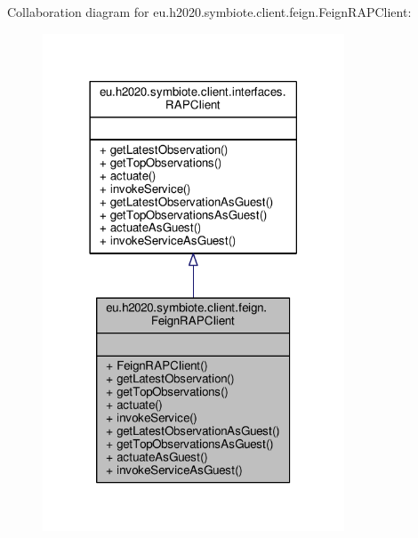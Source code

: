 Collaboration diagram for eu.\+h2020.\+symbiote.\+client.\+feign.\+Feign\+R\+A\+P\+Client\+:\nopagebreak
\begin{figure}[H]
\begin{center}
\leavevmode
\includegraphics[width=254pt]{classeu_1_1h2020_1_1symbiote_1_1client_1_1feign_1_1FeignRAPClient__coll__graph}
\end{center}
\end{figure}
